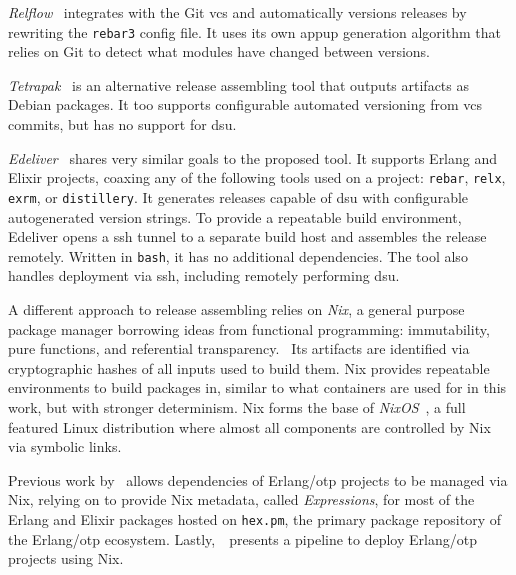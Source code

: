 \emph{Relflow}~\cite{relflow} integrates with the Git \acrfull{vcs} and automatically versions releases by rewriting the \lstinline|rebar3| config file. It uses its own \acrshort{appup} generation algorithm that relies on Git to detect what modules have changed between versions.

\emph{Tetrapak}~\cite{tetrapak} is an alternative release assembling tool that outputs artifacts as Debian packages. It too supports configurable automated versioning from \acrshort{vcs} commits, but has no support for \acrshort{dsu}.

\emph{Edeliver}~\cite{edeliver,talk:edeliver} shares very similar goals to the proposed tool. It supports Erlang and Elixir projects, coaxing any of the following tools used on a project: \lstinline|rebar|, \lstinline|relx|, \lstinline|exrm|, or \lstinline|distillery|. It generates releases capable of \acrshort{dsu} with configurable autogenerated version strings. To provide a repeatable build environment, Edeliver opens a \acrfull{ssh} tunnel to a separate build host and assembles the release remotely. Written in \lstinline|bash|, it has no additional dependencies. The tool also handles deployment via \acrshort{ssh}, including remotely performing \acrshort{dsu}.

A different approach to release assembling relies on \emph{Nix}, a general purpose package manager borrowing ideas from functional programming: immutability, pure functions, and referential transparency.~\cite{nix1} Its artifacts are identified via cryptographic hashes of all inputs used to build them. Nix provides repeatable environments to build packages in, similar to what containers are used for in this work, but with stronger determinism. Nix forms the base of \emph{NixOS}~\cite{nixos}, a full featured Linux distribution where almost all components are controlled by Nix via symbolic links.

Previous work by~\cite{erlangnix} allows dependencies of Erlang/\acrshort{otp} projects to be managed via Nix, relying on \cite{hex2nix} to provide Nix metadata, called \emph{Expressions}, for most of the Erlang and Elixir packages hosted on \lstinline|hex.pm|, the primary package repository of the Erlang/\acrshort{otp} ecosystem. Lastly,~\cite{erlangnix2}~presents a pipeline to deploy Erlang/\acrshort{otp} projects using Nix.
